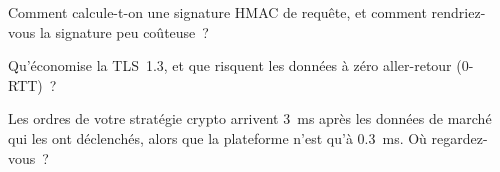 \begin{interviewq}\label{iq:ll:websocket-rest-tls-and-json-at-speed:4}
Comment calcule-t-on une signature HMAC de requête, et comment rendriez-vous la signature peu coûteuse~?
\end{interviewq}

\begin{interviewq}\label{iq:ll:websocket-rest-tls-and-json-at-speed:5}
Qu'économise la  TLS~1.3, et que risquent les données à zéro aller-retour (0-RTT)~?
\end{interviewq}

\begin{interviewq}\label{iq:ll:websocket-rest-tls-and-json-at-speed:6}
Les ordres de votre stratégie crypto arrivent 3~ms après les données de marché qui les ont déclenchés, alors que la plateforme n'est qu'à 0.3~ms. Où
regardez-vous~?
\end{interviewq}
